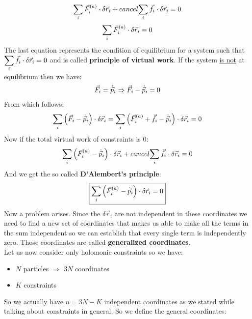 \begin{equation}
    \displaystyle\sum_i \vec{F}^{(a)}_i \cdot \delta \vec{r}_i + \\cancel{\displaystyle\sum_i \vec{f}_i \cdot \delta \vec{r}_i} = 0
\end{equation}
\begin{equation}
    \displaystyle\sum_i \vec{F}^{(a)}_i \cdot \delta \vec{r}_i = 0
\end{equation}
The last equation represents the condition of equilibrium for a system such that $\displaystyle\sum_i \vec{f}_i \cdot \delta \vec{r}_i = 0$ and is called \textbf{principle of virtual work}.
If the system \underline{is not} at equilibrium then we have:
\begin{equation}
    \vec{F}_i = \dot{\vec{p}}_i \Rightarrow \vec{F}_i - \dot{\vec{p}}_i = 0
\end{equation}
From which follows:
\begin{equation}
    \displaystyle\sum_i \left(\vec{F}_i - \dot{\vec{p}}_i\right) \cdot \delta \vec{r}_i = \displaystyle\sum_i \left(\vec{F}^{(a)}_i + \vec{f}_i - \dot{\vec{p}}_i\right) \cdot \delta \vec{r}_i = 0
\end{equation}
Now if the total virtual work of constraints is 0:
\begin{equation}
    \displaystyle\sum_i \left(\vec{F}^{(a)}_i - \dot{\vec{p}}_i\right) \cdot \delta \vec{r}_i + \\cancel{\displaystyle\sum_i \vec{f}_i \cdot \delta \vec{r}_i} = 0
\end{equation}
And we get the so called \textbf{D'Alembert's principle}:
\begin{equation}  \label{D'Alambert_principle}
    \boxed{\displaystyle\sum_i \left(\vec{F}^{(a)}_i - \dot{\vec{p}}_i\right) \cdot \delta \vec{r}_i = 0}
\end{equation}
Now a problem arises. Since the $\delta \vec{r}_i$ are not independent in these coordinates we need to find a new set of coordinates that makes us able to make all the terms in the sum independent so we can establish that every single term is independently zero.
Those coordinates are called \textbf{generalized coordinates}.\\
Let us now consider only holomonic constraints so we have:
\begin{itemize}
    \item $N$ particles $\Rightarrow$ $3N$ coordinates
    \item $K$ constraints
\end{itemize}
So we actually have $n = 3N-K$ independent coordinates as we stated while talking about constraints in general. So we define the general coordinates:
